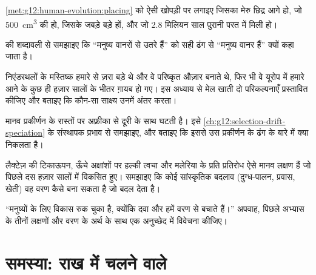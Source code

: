 \begin{exercise}[$\star\star$]\label{exo:g12:human-evolution:10}
\cref{met:g12:human-evolution:placing} को ऐसी खोपड़ी पर लगाइए जिसका मेरु
छिद्र आगे हो, जो \qty{500}{cm^3} की हो, जिसके जबड़े बड़े हों, और जो 2.8
मिलियन साल पुरानी परत में मिली हो।
\end{exercise}

\begin{exercise}[$\star\star$]\label{exo:g12:human-evolution:11}
 की शब्दावली से समझाइए कि ``मनुष्य वानरों से उतरे हैं'' को सही ढंग
से ``मनुष्य वानर हैं'' क्यों कहा जाता है।
\end{exercise}

\begin{exercise}[$\star\star\star$]\label{exo:g12:human-evolution:12}
निएंडरथलों के मस्तिष्क हमारे से ज़रा बड़े थे और वे परिष्कृत औज़ार बनाते थे,
फिर भी वे यूरोप में हमारे आने के कुछ ही हज़ार सालों के भीतर ग़ायब हो गए।
इस अध्याय से मेल खाती दो परिकल्पनाएँ प्रस्तावित कीजिए और बताइए कि कौन-सा
साक्ष्य उनमें अंतर करता।
\end{exercise}

\begin{exercise}[$\star\star\star$]\label{exo:g12:human-evolution:13}
मानव  प्रकीर्णन के रास्तों पर अफ़्रीका से दूरी के साथ घटती
है। इसे \cref{ch:g12:selection-drift-speciation} के संस्थापक प्रभाव से
समझाइए, और बताइए कि इससे उस प्रकीर्णन के ढंग के बारे में क्या निकलता है।
\end{exercise}

\begin{exercise}[$\star\star\star$]\label{exo:g12:human-evolution:14}
लैक्टेज़ की टिकाऊपन, ऊँचे अक्षांशों पर हल्की त्वचा और मलेरिया के प्रति
प्रतिरोध ऐसे मानव लक्षण हैं जो पिछले दस हज़ार सालों में विकसित हुए।
समझाइए कि कोई सांस्कृतिक बदलाव (दुग्ध-पालन, प्रवास, खेती) वह वरण कैसे बना
सकता है जो  बदल देता है।
\end{exercise}

\begin{exercise}[$\star\star\star$]\label{exo:g12:human-evolution:15}
``मनुष्यों के लिए विकास रुक चुका है, क्योंकि दवा और  हमें वरण से
बचाते हैं।'' अपवाह, पिछले अभ्यास के तीनों लक्षणों और वरण के अर्थ के साथ एक
अनुच्छेद में विवेचना कीजिए।
\end{exercise}

\section{समस्या: राख में चलने वाले}

